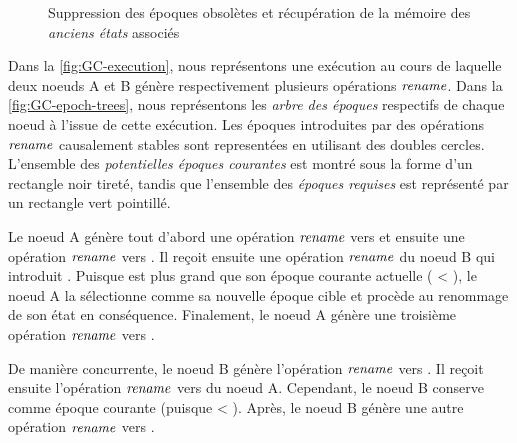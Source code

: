 \begin{figure}[!ht]
{\begin{minipage}{\linewidth}
          \label{fig:GC-epoch-trees}
      \end{minipage}}
  \caption{Suppression des époques obsolètes et récupération de la mémoire des \emph{anciens états} associés}
  \label{fig:GC-epochs}
\end{figure}

Dans la \autoref{fig:GC-execution}, nous représentons une exécution au cours de laquelle deux noeuds A et B génère respectivement plusieurs opérations $\mathit{rename}$.
Dans la \autoref{fig:GC-epoch-trees}, nous représentons les \emph{arbre des époques} respectifs de chaque noeud à l'issue de cette exécution.
Les époques introduites par des opérations $\mathit{rename}$ causalement stables sont representées en utilisant des doubles cercles.
L'ensemble des \emph{potentielles époques courantes} est montré sous la forme d'un rectangle noir tireté, tandis que l'ensemble des \emph{époques requises} est représenté par un rectangle vert pointillé.

Le noeud A génère tout d'abord une opération $\mathit{rename}$ vers  et ensuite une opération $\mathit{rename}$ vers .
Il reçoit ensuite une opération $\mathit{rename}$ du noeud B qui introduit .
Puisque  est plus grand que son époque courante actuelle ( < ), le noeud A la sélectionne comme sa nouvelle époque cible et procède au renommage de son état en conséquence.
Finalement, le noeud A génère une troisième opération $\mathit{rename}$ vers .

De manière concurrente, le noeud B génère l'opération $\mathit{rename}$ vers .
Il reçoit ensuite l'opération $\mathit{rename}$ vers  du noeud A.
Cependant, le noeud B conserve  comme époque courante (puisque  < ).
Après, le noeud B génère une autre opération $\mathit{rename}$ vers .

